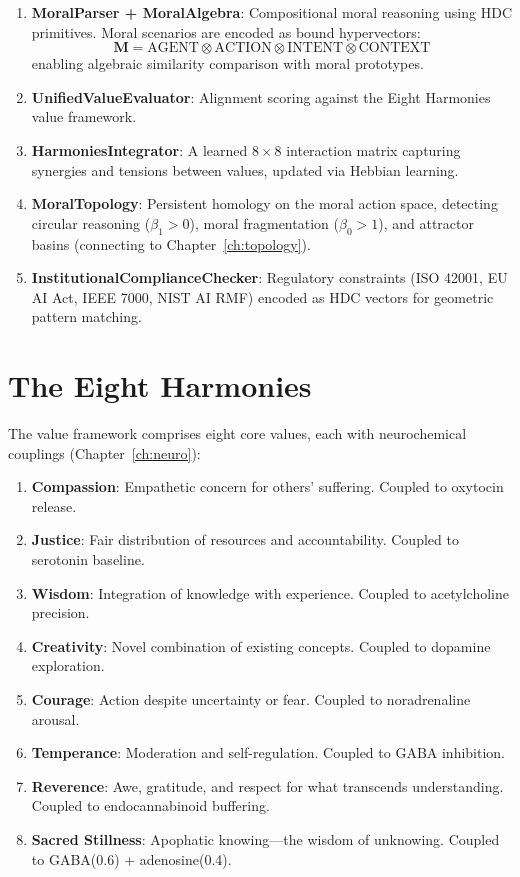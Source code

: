 \documentclass[12pt]{book}
\newcommand{\bind}{\otimes}
\begin{document}
\begin{enumerate}
  \item \textbf{MoralParser + MoralAlgebra}: Compositional moral reasoning using HDC primitives. Moral scenarios are encoded as bound hypervectors:
  \begin{equation}
  \mathbf{M} = \text{AGENT} \bind \text{ACTION} \bind \text{INTENT} \bind \text{CONTEXT}
  \end{equation}
  enabling algebraic similarity comparison with moral prototypes.
  \item \textbf{UnifiedValueEvaluator}: Alignment scoring against the Eight Harmonies value framework.
  \item \textbf{HarmoniesIntegrator}: A learned $8 \times 8$ interaction matrix capturing synergies and tensions between values, updated via Hebbian learning.
  \item \textbf{MoralTopology}: Persistent homology on the moral action space, detecting circular reasoning ($\beta_1 > 0$), moral fragmentation ($\beta_0 > 1$), and attractor basins (connecting to Chapter~\ref{ch:topology}).
  \item \textbf{InstitutionalComplianceChecker}: Regulatory constraints (ISO 42001, EU AI Act, IEEE 7000, NIST AI RMF) encoded as HDC vectors for geometric pattern matching.
\end{enumerate}

\section{The Eight Harmonies}

The value framework comprises eight core values, each with neurochemical couplings (Chapter~\ref{ch:neuro}):

\begin{enumerate}
  \item \textbf{Compassion}: Empathetic concern for others' suffering. Coupled to oxytocin release.
  \item \textbf{Justice}: Fair distribution of resources and accountability. Coupled to serotonin baseline.
  \item \textbf{Wisdom}: Integration of knowledge with experience. Coupled to acetylcholine precision.
  \item \textbf{Creativity}: Novel combination of existing concepts. Coupled to dopamine exploration.
  \item \textbf{Courage}: Action despite uncertainty or fear. Coupled to noradrenaline arousal.
  \item \textbf{Temperance}: Moderation and self-regulation. Coupled to GABA inhibition.
  \item \textbf{Reverence}: Awe, gratitude, and respect for what transcends understanding. Coupled to endocannabinoid buffering.
  \item \textbf{Sacred Stillness}: Apophatic knowing---the wisdom of unknowing. Coupled to GABA(0.6) + adenosine(0.4).
\end{enumerate}
\end{document}
